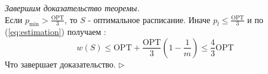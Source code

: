 \documentclass[10pt]{article}
\begin{document}
                {\itshape Завершим доказательство теоремы.} \\
                Если $p_{\min} > \frac{\text{OPT}}{3}$, то $S$ - оптимальное расписание. Иначе $p_l \leq \frac{\text{OPT}}{3}$ 
                и по (\ref{eq:estimation}) получаем :
                \begin{equation}
                    w(S) \leq \text{OPT} + \frac{\text{OPT}}{3} (1 - \frac{1}{m}) \leq \frac{4}{3} \text{OPT}
                \end{equation}
                Что завершает доказательство. $\triangleright$
\end{document}
